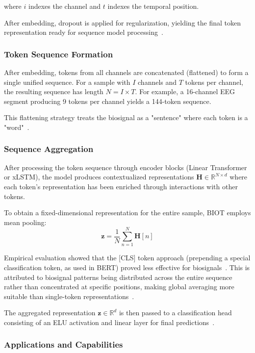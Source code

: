 where $i$ indexes the channel and $t$ indexes the temporal position.

After embedding, dropout is applied for regularization, yielding the final token representation ready for sequence model processing~\cite{yang2023biot}.

\subsubsection{Token Sequence Formation}

After embedding, tokens from all channels are concatenated (flattened) to form a single unified sequence. For a sample with $I$ channels and $T$ tokens per channel, the resulting sequence has length $N = I \times T$. For example, a 16-channel \ac{EEG} segment producing 9 tokens per channel yields a 144-token sequence.

This flattening strategy treats the biosignal as a "sentence" where each token is a "word"~\cite{yang2023biot}.

\subsubsection{Sequence Aggregation}

After processing the token sequence through encoder blocks (Linear Transformer or \ac{xLSTM}), the model produces contextualized representations $\mathbf{H} \in \mathbb{R}^{N \times d}$ where each token's representation has been enriched through interactions with other tokens.

To obtain a fixed-dimensional representation for the entire sample, \ac{BIOT} employs mean pooling:
$$\mathbf{z} = \frac{1}{N} \sum_{n=1}^{N} \mathbf{H}[n]$$

Empirical evaluation showed that the [CLS] token approach (prepending a special classification token, as used in BERT) proved less effective for biosignals~\cite{yang2023biot}. This is attributed to biosignal patterns being distributed across the entire sequence rather than concentrated at specific positions, making global averaging more suitable than single-token representations~\cite{yang2023biot}.

The aggregated representation $\mathbf{z} \in \mathbb{R}^{d}$ is then passed to a classification head consisting of an \ac{ELU} activation and linear layer for final predictions~\cite{yang2023biot}.

\subsubsection{Applications and Capabilities}

